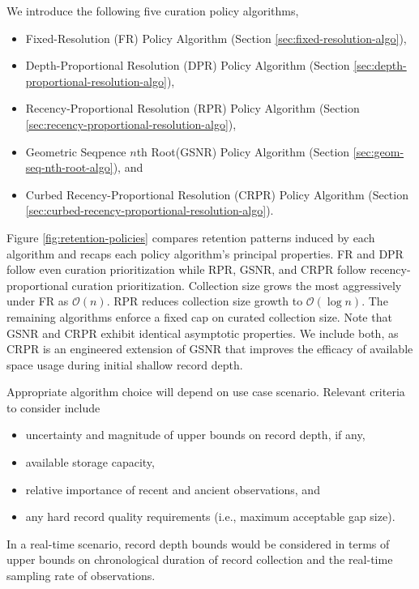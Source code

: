 We introduce the following five curation policy algorithms,
\begin{itemize}
\item Fixed-Resolution (FR) Policy Algorithm (Section \ref{sec:fixed-resolution-algo}),
\item Depth-Proportional Resolution (DPR) Policy Algorithm (Section \ref{sec:depth-proportional-resolution-algo}),
\item Recency-Proportional Resolution (RPR) Policy Algorithm (Section \ref{sec:recency-proportional-resolution-algo}),
\item Geometric Seqpence $n$th Root(GSNR) Policy Algorithm (Section \ref{sec:geom-seq-nth-root-algo}), and
\item Curbed Recency-Proportional Resolution (CRPR) Policy Algorithm (Section \ref{sec:curbed-recency-proportional-resolution-algo}).
\end{itemize}
Figure \ref{fig:retention-policies} compares retention patterns induced by each algorithm and recaps each policy algorithm's principal properties.
FR and DPR follow even curation prioritization while RPR, GSNR, and CRPR follow recency-proportional curation prioritization.
Collection size grows the most aggressively under FR as $\mathcal{O}(n)$.
RPR reduces collection size growth to $\mathcal{O}(\log n)$.
The remaining algorithms enforce a fixed cap on curated collection size.
Note that GSNR and CRPR exhibit identical asymptotic properties.
We include both, as CRPR is an engineered extension of GSNR that improves the efficacy of available space usage during initial shallow record depth.

Appropriate algorithm choice will depend on use case scenario.
Relevant criteria to consider include
\begin{itemize}
  \item uncertainty and magnitude of upper bounds on record depth, if any,
  \item available storage capacity,
  \item relative importance of recent and ancient observations, and
  \item any hard record quality requirements (i.e., maximum acceptable gap size).
\end{itemize}

In a real-time scenario, record depth bounds would be considered in terms of upper bounds on chronological duration of record collection and the real-time sampling rate of observations.










